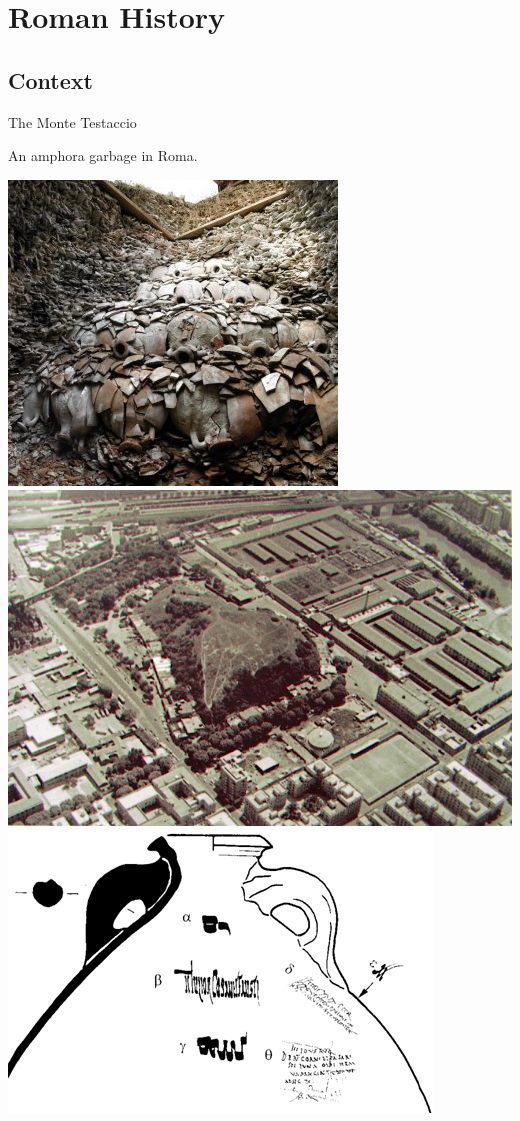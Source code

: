 \documentclass[8pt, handout=show,notes=show]{beamer}
\begin{document}
\section{Roman History}
\subsection*{Context}

\begin{frame}{The Monte Testaccio}

	An amphora garbage in Roma.\\

	\begin{center}
		\includegraphics[height=0.3\textwidth]{images/Mount-Testaccio.jpg}
		\hfil \includegraphics[height=0.3\textwidth]{images/Mount-Testaccio2.jpg}\\
		\vfill
		\includegraphics[height=0.3\textwidth]{images/titulus.png}

	\end{center}

\end{frame}
\end{document}
